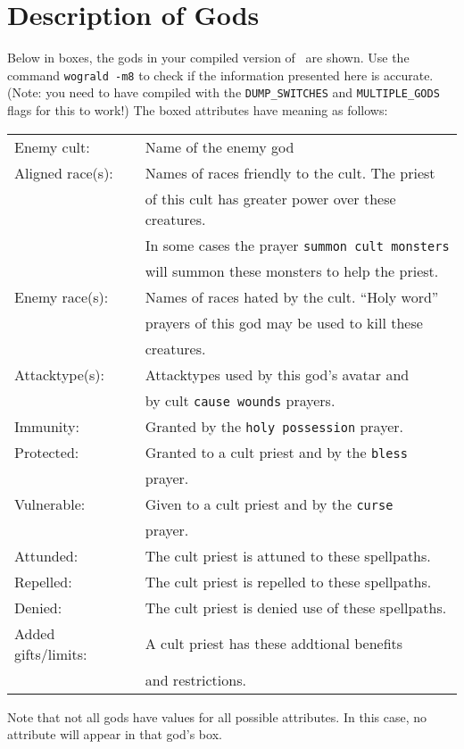 \chapter{Description of Gods}
\label{app:gods}

Below in boxes, the gods in your compiled version of \cf\ are shown.
Use the command {\tt wograld -m8} to check if the information
presented here is accurate.
(Note: you need to have compiled with the {\tt DUMP\_SWITCHES} and
{\tt MULTIPLE\_GODS} flags for this to work!) The boxed attributes 
have meaning as follows:
\vskip 12pt
\begin{tabular}{ll} 
Enemy cult: & Name of the enemy god \\
Aligned race(s): & Names of races friendly to the cult. The priest \\
	 & of this cult has greater power over these creatures. \\
	 & In some cases the prayer {\tt summon cult monsters} \\ 
	 & will summon these monsters to help the priest. \\
Enemy race(s): & Names of races hated by the cult. ``Holy word'' \\ 
	 & prayers of this god may be used to kill these \\
	 & creatures. \\
Attacktype(s): & Attacktypes used by this god's avatar and \\
	 & by cult {\tt cause wounds} prayers. \\
Immunity: & Granted by the {\tt holy possession} prayer. \\
Protected: & Granted to a cult priest and by the {\tt bless} \\
	 & prayer. \\
Vulnerable: & Given to a cult priest and by the {\tt curse } \\
	 & prayer. \\
Attunded: & The cult priest is attuned to these spellpaths. \\
Repelled: & The cult priest is repelled to these spellpaths. \\
Denied: & The cult priest is denied use of these spellpaths. \\
Added gifts/limits: & A cult priest has these addtional benefits\\ 
 	& and restrictions. \\
\end{tabular}
\vskip 12pt
Note that not all gods have values for all possible attributes. In
this case, no attribute will appear in that god's box.
 
\begin{longtable}{|p{4cm}p{9cm}|} \hline 

\end{longtable}

